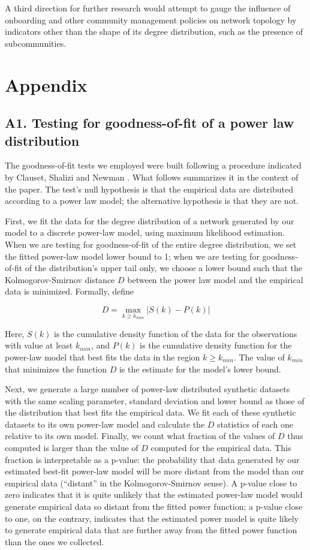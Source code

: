 \documentclass{nws}
\begin{document}
A third direction for further research would attempt to gauge the influence of onboarding and other community management policies on network topology by indicators other than the shape of its degree distribution, such as the presence of subcommunities. 

\section{Appendix}
\subsection{A1. Testing for goodness-of-fit of a power law distribution}

The goodness-of-fit tests we employed were built following a procedure indicated by Clauset, Shalizi and Newman \cite[pp. 15-18]{clauset2009power}. What follows summarizes it in the context of the paper. The test's null hypothesis is that the empirical data are distributed according to a power law model; the alternative hypothesis is that they are not.

First, we fit the data for the degree distribution of a network generated by our model to a discrete power-law model, using maximum likelihood estimation. When we are testing for goodness-of-fit of the entire degree distribution, we set the fitted power-law model lower bound to 1; when we are testing for goodness-of-fit of the distribution's upper tail only, we choose a lower bound  such that the Kolmogorov-Smirnov distance $D$ between the power law model and the empirical data is minimized. Formally, define

$$D = \max_{k \geq k_{min}} | S(k) - P(k) |$$

Here, $S(k)$ is the cumulative density function of the data for the observations with value at least $k_{min}$, and $P(k)$ is the cumulative density function for the power-law model that best fits the data in the region $k \geq k_{min}$. The value of $k_{min}$ that minimizes the function $D$ is the estimate for the model's lower bound.

Next, we generate a large number of power-law distributed synthetic datasets with the same scaling parameter, standard deviation and lower bound as those of the distribution that best fits the empirical data. We fit each of these synthetic datasets to its own power-law model and calculate the $D$ statistics of each one relative to its own model. Finally, we count what fraction of the values of $D$ thus computed is larger than the value of $D$ computed for the empirical data. This fraction is interpretable as a p-value: the probability that data generated by our estimated best-fit power-law model will be more distant from the model than our empirical data (``distant'' in the Kolmogorov-Smirnov sense). A p-value close to zero indicates that it is quite unlikely that the estimated power-law model would generate empirical data so distant from the fitted power function; a p-value close to one, on the contrary, indicates that the estimated power model is quite likely to generate empirical data that are further away from the fitted power function than the ones we collected. 
\end{document}
